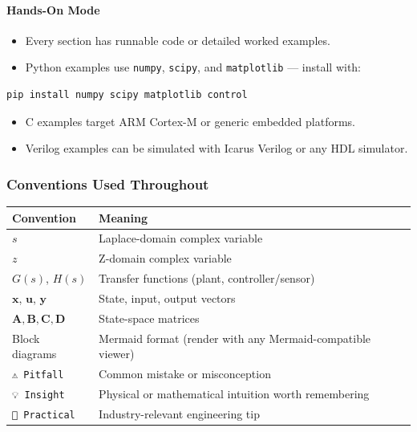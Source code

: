 \documentclass[11pt,a4paper]{book}
\begin{document}
\paragraph{Hands-On Mode}
\begin{itemize}
\item Every section has runnable code or detailed worked examples.
\item Python examples use \texttt{numpy}, \texttt{scipy}, and \texttt{matplotlib} — install with:
\end{itemize}
\begin{lstlisting}[language=bash]
  pip install numpy scipy matplotlib control
\end{lstlisting}
\begin{itemize}
\item C examples target ARM Cortex-M or generic embedded platforms.
\item Verilog examples can be simulated with Icarus Verilog or any HDL simulator.
\end{itemize}

\medskip\noindent\hrulefill\medskip

\subsubsection{Conventions Used Throughout}

\begin{center}
\begin{tabular}{|l|l|}
\hline
Convention & Meaning \\
\hline
$s$ & Laplace-domain complex variable \\
$z$ & Z-domain complex variable \\
$G(s)$, $H(s)$ & Transfer functions (plant, controller/sensor) \\
$\mathbf{x}$, $\mathbf{u}$, $\mathbf{y}$ & State, input, output vectors \\
$\mathbf{A}, \mathbf{B}, \mathbf{C}, \mathbf{D}$ & State-space matrices \\
Block diagrams & Mermaid format (render with any Mermaid-compatible viewer) \\
\texttt{⚠️ Pitfall} & Common mistake or misconception \\
\texttt{💡 Insight} & Physical or mathematical intuition worth remembering \\
\texttt{🔧 Practical} & Industry-relevant engineering tip \\
\hline
\end{tabular}
\end{center}
\end{document}
